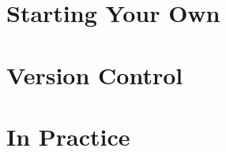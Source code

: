 \documentclass{beamer}
\begin{document}
\section{Starting Your Own}

%

\section{Version Control}


\section{In Practice}

\end{document}

